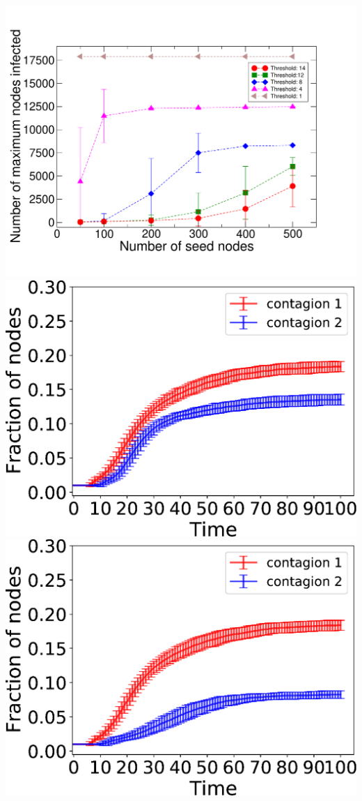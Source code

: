 \documentclass[landscape,a0paper,fontscale=0.285]{baposter} %
\begin{document}
\begin{poster}
{\includegraphics[scale=0.3]{figures/astroph_threshold_cs.pdf}
\includegraphics[scale=0.3]{figures/danville_asym_interaction_100ns_fraction_cum_errorbar.eps}
\includegraphics[scale=0.3]{figures/danville_no_interaction_100ns_fraction_cum_errorbar.eps}
}
\end{poster}
\end{document}
